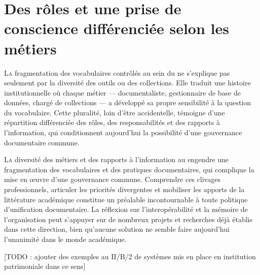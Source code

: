 \chapter[PDV métier]{\label{II-B}Des rôles et une prise de conscience différenciée selon les métiers }

\lettrine{L}a fragmentation des vocabulaires contrôlés au sein du \maelong ne s'explique pas seulement par la diversité des outils ou des collections. Elle traduit une histoire institutionnelle où chaque métier — documentaliste, gestionnaire de base de données, chargé de collections — a développé sa propre sensibilité à la question du vocabulaire. Cette pluralité, loin d'être accidentelle, témoigne d'une répartition différenciée des rôles, des responsabilités et des rapports à l'information, qui conditionnent aujourd'hui la possibilité d'une gouvernance documentaire commune.




\bigskip
\bigskip
\bigskip

\lettrine{L}{a} diversité des métiers et des rapports à l'information au \mae engendre une fragmentation des vocabulaires et des pratiques documentaires, qui complique la mise en œuvre d'une gouvernance commune. Comprendre ces clivages professionnels, articuler les priorités divergentes et mobiliser les apports de la littérature académique constitue un préalable incontournable à toute politique d'unification documentaire. La réflexion sur l'interopérabilité et la mémoire de l'organisation peut s'appuyer sur de nombreux projets et recherches déjà établis dans cette direction, bien qu'aucune solution ne semble faire aujourd'hui l'unanimité dans le monde académique.

[TODO : ajouter des exemples au II/B/2 de systèmes mis en place en institution patrimoniale dans ce sens]